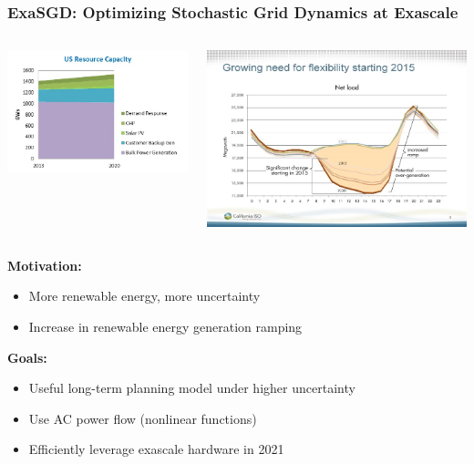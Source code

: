 \begin{frame}
  \frametitle{ExaSGD: Optimizing Stochastic Grid Dynamics at Exascale
}
\begin{columns}
  \begin{column}{0.45\textwidth}
    \includegraphics[width=\textwidth]{./figures/generation}
  \end{column}
  \begin{column}{0.45\textwidth}
    \includegraphics[width=\textwidth]{./figures/ramping}
  \end{column}
\end{columns}
  \begin{center}
      \end{center}
  {\bf Motivation:}
  \begin{itemize}
    \item More renewable energy, more uncertainty
    \item Increase in renewable energy generation ramping
  \end{itemize}
  {\bf Goals:}
  \begin{itemize}
    \item Useful long-term planning model under higher uncertainty
    \item Use AC power flow (nonlinear functions) 
    \item Efficiently leverage exascale hardware in 2021
  \end{itemize}
\end{frame}

